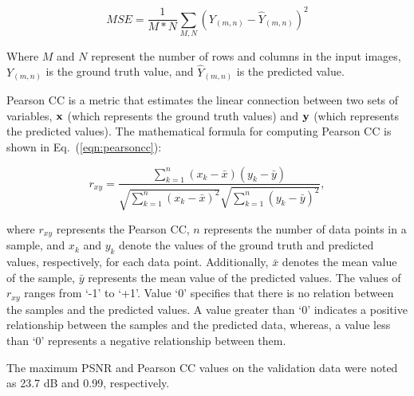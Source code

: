 \begin{equation}
	M S E=\frac{1}{M * N} \sum_{M, N}\left(Y_{(m, n)}-\hat{Y}_{(m, n)}\right)^2
	\label{eqn:mse}
\end{equation}

Where \(M\) and \(N\) represent the number of rows and columns in the input 
images, $Y_{(m, n)}$ is the ground truth value, and $\hat{Y}_{(m, n)}$ is the 
predicted value.

Pearson CC is a metric that estimates the linear connection between two sets of variables, \(\mathbf{x}\) (which represents the ground truth values) and \(\mathbf{y}\) (which represents the predicted values). 
The mathematical formula for computing Pearson CC is shown in Eq.~(\ref{eqn:pearsoncc}):

\begin{equation}
	r_{x 
		y}=\frac{\sum_{k=1}^n\left(x_k-\bar{x}\right)\left(y_k-\bar{y}\right)}{\sqrt{\sum_{k=1}^n\left(x_k-\bar{x}\right)^2}
		\sqrt{\sum_{k=1}^n\left(y_k-\bar{y}\right)^2}},
	\label{eqn:pearsoncc}
\end{equation}

where $r_{xy}$ represents the Pearson CC, \(n\) represents the number of data points in a sample, and $x_k$ and $y_k$ denote the values of the ground truth and predicted values, respectively, for each data point. 
Additionally, $\bar{x}$ denotes the mean value of the sample, $\bar{y}$ represents the mean value of the predicted values. 
The values of $r_{xy}$ ranges from ‘-1’ to ‘+1’. 
Value ‘0’ specifies that there is no relation between the samples and the predicted values. 
A value greater than ‘0’ indicates a positive relationship between the samples and the predicted data, whereas, a value less than ‘0’ represents a negative relationship between them.

The maximum PSNR and Pearson CC values on the validation data were noted as 23.7 dB and 0.99, respectively.
